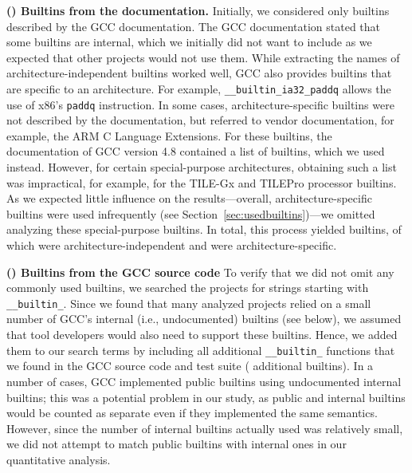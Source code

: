 \documentclass[sigconf,screen]{acmart}
\renewcommand{\paragraph}[1]{\textbf{#1}}
\newcommand\code[1]{\texttt{#1}}
\newcommand{\RNum}[1]{\uppercase\expandafter{\romannumeral #1\relax}}
\begin{document}
\paragraph{(\RNum{1}) Builtins from the documentation.}
Initially, we considered only builtins described by the GCC documentation.
The GCC documentation stated that some builtins are internal, which we initially did not want to include as we expected that other projects would not use them.
While extracting the names of architecture-independent builtins worked well, GCC also provides builtins that are specific to an architecture.
For example, \code{\_\_builtin\_ia32\_paddq} allows the use of
x86's \code{paddq} instruction.
In some cases, architecture-specific builtins were not described by the documentation, but referred to vendor documentation, for example, the ARM C Language Extensions.
For these builtins, the documentation of GCC version 4.8 contained a list of builtins, which we used instead.
However, for certain special-purpose architectures, obtaining such a list was impractical, for example, for the TILE-Gx and TILEPro processor builtins.
As we expected little influence on the results---overall, architecture-specific builtins were used infrequently (see Section~\ref{sec:usedbuiltins})---we omitted analyzing these special-purpose builtins.
In total, this process yielded \nrDefBuiltins{} builtins, of which \nrArchitectureIndependentBuiltins{} were architecture-independent and \nrArchitectureSpecificBuiltins{} were architecture-specific.

\paragraph{(\RNum{2}) Builtins from the GCC source code}
To verify that we did not omit any commonly used builtins, we searched the projects for strings starting with \code{\_\_builtin\_}.
Since we found that many analyzed projects relied on a small number of GCC's internal (i.e., undocumented) builtins (see below), we assumed that tool developers would also need to support these builtins. Hence, we added them to our search terms by including all additional \code{\_\_builtin\_} functions that we found in the GCC source code and test suite (\nrGCCInternalBuiltins{} additional builtins).
In a number of cases, GCC implemented public builtins using undocumented internal builtins; this was a potential problem in our study, as public and internal builtins would be counted as separate even if they implemented the same semantics.
However, since the number of internal builtins actually used was relatively small, we did not attempt to match public builtins with internal ones in our quantitative analysis.
\end{document}
